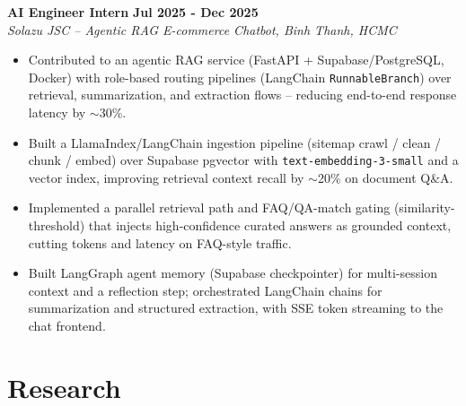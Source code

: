 \documentclass[a4paper,10pt]{article}
\begin{document}
\vspace{0.3em}
\noindent\textbf{AI Engineer Intern} \hfill \textbf{Jul 2025 - Dec 2025} \\
\textit{Solazu JSC -- Agentic RAG E-commerce Chatbot, Binh Thanh, HCMC} \\
\vspace{-0.3em}
\begin{itemize}[leftmargin=1.2em, itemsep=0.05em, parsep=0pt, topsep=0pt]
    \item Contributed to an agentic RAG service (FastAPI + Supabase/PostgreSQL, Docker) with role-based routing pipelines (LangChain \texttt{RunnableBranch}) over retrieval, summarization, and extraction flows -- reducing end-to-end response latency by $\sim$30\%.
    \item Built a LlamaIndex/LangChain ingestion pipeline (sitemap crawl / clean / chunk / embed) over Supabase pgvector with \texttt{text-embedding-3-small} and a vector index, improving retrieval context recall by $\sim$20\% on document Q\&A.
    \item Implemented a parallel retrieval path and FAQ/QA-match gating (similarity-threshold) that injects high-confidence curated answers as grounded context, cutting tokens and latency on FAQ-style traffic.
    \item Built LangGraph agent memory (Supabase checkpointer) for multi-session context and a reflection step; orchestrated LangChain chains for summarization and structured extraction, with SSE token streaming to the chat frontend.
\end{itemize}

\section{Research}
\end{document}
